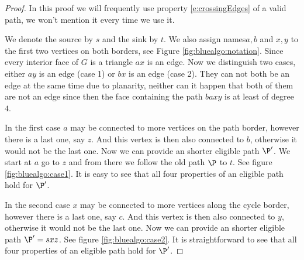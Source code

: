 \begin{proof}
In this proof we will frequently use property \ref{e:crossingEdges} of a valid path, we won't mention it every time we use it.

We denote the source by $s$ and the sink by $t$. We also assign names$a, b$ and $x, y$ to the first two vertices on both borders, see Figure \ref{fig:bluealgo:notation}. Since every interior face of $G$ is a triangle $ax$ is an edge. Now we distinguish two cases, either $ay$ is an edge (case 1) or $bx$ is an edge (case 2). They can not both be an edge at the same time due to planarity, neither can it happen that both of them are not an edge since then the face containing the path $baxy$ is at least of degree $4$.

In the first case $a$ may be connected to more vertices on the path border, however there is a last one, say $z$. And this vertex is then also connected to $b$, otherwise it would not be the last one. Now we can provide an shorter eligible path $\P'$. We start at $a$ go to $z$ and from there we follow the old path $\P$ to $t$.  See figure \ref{fig:bluealgo:case1}. It is easy to see that all four properties of an eligible path hold for $\P'$.

In the second case $x$ may be connected to more vertices along the cycle border, however there is a last one, say $c$. And this vertex is then also connected to $y$, otherwise it would not be the last one. Now we can provide an shorter eligible path $\P' = sxz$.   See figure \ref{fig:bluealgo:case2}. It is straightforward to see that all four properties of an eligible path hold for $\P'$. %
\end{proof}

